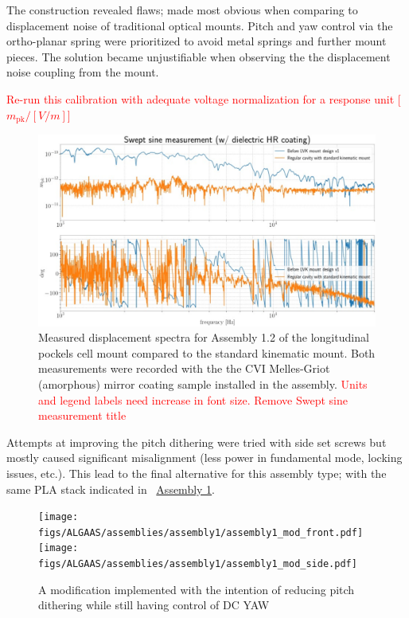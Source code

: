 The construction revealed flaws; made most obvious when comparing to displacement noise of traditional optical mounts. Pitch and yaw control via the ortho-planar spring were prioritized to avoid metal springs and further mount pieces. The solution became unjustifiable when observing the the displacement noise coupling from the mount.

\textcolor{red}{Re-run this calibration with adequate voltage normalization for a response unit [$m_\mathrm{pk} / [V / m]$]}

\begin{figure}[H]
\centering
\includegraphics[width=\textwidth]{figs/ALGAAS/assemblies/assembly1/assembly1_2_compare_standmount.pdf}
\caption{Measured displacement spectra for Assembly 1.2 of the longitudinal pockels cell mount compared to the standard kinematic mount. Both measurements were recorded with the the CVI Melles-Griot (amorphous) mirror coating sample installed in the assembly. \textcolor{red}{Units and legend labels need increase in font size. Remove Swept sine measurement title}}
\label{fig:assembly2_compare_kinematic_mount}
\end{figure}

Attempts at improving the pitch dithering were tried with side set screws but mostly caused significant misalignment (less power in fundamental mode, locking issues, etc.). This lead to the final alternative for this assembly type; with the same PLA stack indicated in ~\hyperref[fig:assembly1]{Assembly 1}.

\begin{figure}[!h]
	\begin{subcaptiongroup}
		\texttt{[image: figs/ALGAAS/assemblies/assembly1/assembly1\_mod\_front.pdf]}
		\label{A1_front}
		\texttt{[image: figs/ALGAAS/assemblies/assembly1/assembly1\_mod\_side.pdf]}
		\label{A1_side}
	\end{subcaptiongroup}
    \caption{A modification implemented  with the intention of reducing pitch dithering while still having control of DC YAW}
    \label{fig:assembly1_mod}
\end{figure}


